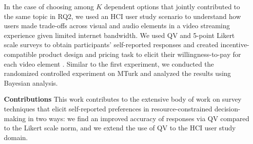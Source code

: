 In the case of choosing among $K$ dependent options that jointly contributed to the same topic in RQ2, we used an HCI user study scenario to understand how users made trade-offs across visual and audio elements in a video streaming experience given limited internet bandwidth. We used QV and 5-point Likert scale surveys to obtain participants' self-reported responses and created  incentive-compatible product design and pricing task to elicit their willingness-to-pay for each video element \cite{roth1982incentive}. Similar to the first experiment, we conducted the randomized controlled experiment on MTurk and analyzed the results using Bayesian analysis.

\textbf{Contributions} This work contributes to the extensive body of work on survey techniques that elicit self-reported preferences in resource-constrained decision-making in two ways: we find an improved accuracy of responses via QV compared to the Likert scale norm, and we extend the use of QV to the HCI user study domain.

